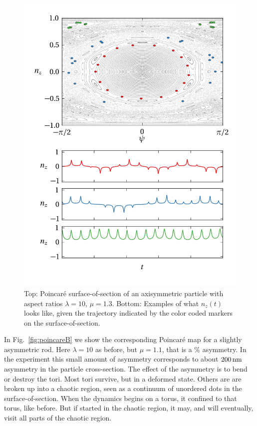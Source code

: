 \documentclass[thesis.tex]{subfiles}
\begin{document}
\begin{figure}
\includegraphics[width=12cm]{figs/poincareC.png}%
\caption{\label{fig:poincareC} Top: Poincar\'e surface-of-section of an axisymmetric particle with aspect ratios $\lambda=10$, $\mu=1.3$. Bottom: Examples of what $n_z(t)$ looks like, given the trajectory indicated by the color coded markers on the surface-of-section. }%
\end{figure}

In Fig.~\ref{fig:poincareB} we show the corresponding Poincar\'e map for a slightly asymmetric rod. Here $\lambda=10$ as before, but $\mu = 1.1$, that is a \unit[10]{\%} asymmetry. In the experiment this small amount of asymmetry corresponds to about $\unit[200]{nm}$ asymmetry in the particle cross-section. The effect of the asymmetry is to bend or destroy the tori. Most tori survive, but in a deformed state. Others are are broken up into a chaotic region, seen as a continuum of unordered dots in the surface-of-section. When the dynamics begins on a torus, it confined to that torus, like before. But if started in the chaotic region, it may, and will eventually, visit all parts of the chaotic region.
\end{document}
